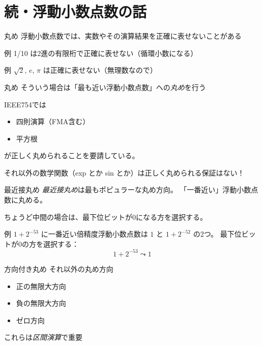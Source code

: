 \documentclass[aspectratio=169]{beamer}
\begin{document}
\section{続・浮動小数点数の話}
\begin{frame}{丸め}
  浮動小数点数では、実数やその演算結果を正確に表せないことがある

  \begin{block}{例}
    1/10 は2進の有限桁で正確に表せない（循環小数になる）
  \end{block}

  \begin{block}{例}
    \(\sqrt{2}\), $e$, $\pi$ は正確に表せない（無理数なので）
  \end{block}
\end{frame}
\begin{frame}{丸め}
  そういう場合は「最も近い浮動小数点数」への\emph{丸め}を行う

  IEEE754では
  \begin{itemize}
  \item 四則演算（FMA含む）
  \item 平方根
  \end{itemize}
  が正しく丸められることを要請している。

  それ以外の数学関数（exp とか sin とか）は正しく丸められる保証はない！
\end{frame}
\begin{frame}{最近接丸め}
  \emph{最近接丸め}は最もポピュラーな丸め方向。
  「一番近い」浮動小数点数に丸める。

  ちょうど中間の場合は、最下位ビットが0になる方を選択する。
  \begin{block}{例}
    \(1+2^{-53}\) に一番近い倍精度浮動小数点数は $1$ と $1+2^{-52}$ の2つ。
    最下位ビットが0の方を選択する：
    \[1+2^{-53}\leadsto 1\]
  \end{block}
\end{frame}
\begin{frame}{方向付き丸め}
  それ以外の丸め方向
  \begin{itemize}
  \item 正の無限大方向
  \item 負の無限大方向
  \item ゼロ方向
  \end{itemize}
  これらは\emph{区間演算}で重要
\end{frame}
\end{document}
